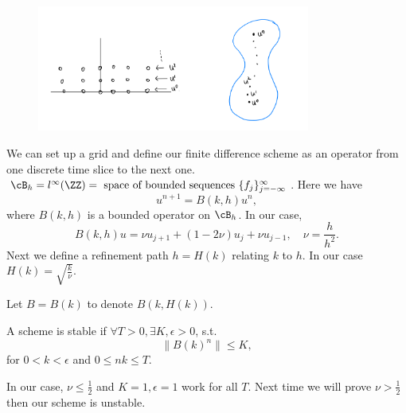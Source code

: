 \begin{figure}[H]
    \centering
    \includegraphics[width=0.8\textwidth]{figures/3-grid.png}
\end{figure}
We can set up a grid and define our finite difference scheme as an operator from one discrete time slice to the next one.  $ \cB_h = l^\infty (\ZZ) = \text{ space of bounded sequences }  \{f_j\}_{j=-\infty}^\infty $. Here we have 
\[
    u^{n+1}=B(k, h) u^n, 
\] 
where $B(k,h)$ is a bounded operator on $\cB_h$.  In our case, 
\[
    B(k, h) u= \nu  u_{j+1}+(1-2 \nu ) u_j+ \nu  u_{j-1}, \quad \nu=\frac{h}{h^2}. 
\]
Next we define a refinement path $h=H(k)$ relating $k$ to $h$. In our case $H(k) = \sqrt{\frac{k}{ \nu }} $.  

Let $B= B(k)$ to denote $B(k, H(k))$.  


\begin{definition}
[Stable]
\label{def: Stable}
A scheme is stable if $\forall T>0, \exists K, \epsilon >0$, s.t. 
\[
    \|B(k)^n \| \le K,
\]
for $0<k<\epsilon $ and $0\le nk \le T$. 
\end{definition}
In our case, $\nu\le \frac{1}{2}$ and $K=1, \epsilon =1$ work for all $T$.  Next time we will prove $\nu >\frac{1}{2}$ then our scheme is unstable.  

